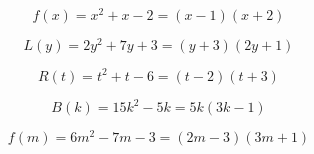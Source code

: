 \documentclass{ximera}
\author{Lee Wayand}
\begin{document}
\begin{example}








\begin{question}


\[
f(x) = x^2 + x - 2 = (x-1) \left( x+2 \right)
\]

\end{question}





\begin{question}


\[
L(y) = 2y^2 + 7y + 3 = (y+3) \left( 2y+1 \right)
\]

\end{question}





\begin{question}


\[
R(t) = t^2 + t - 6 = (t-2) \left( t+3 \right)
\]

\end{question}





\begin{question}


\[
B(k) = 15k^2 - 5k = 5k \left( 3k - 1 \right)
\]

\end{question}








\begin{question}


\[
f(m) = 6m^2 -7m - 3 = (2m - 3) \left( 3m + 1 \right)
\]

\end{question}












\end{example}
\end{document}
